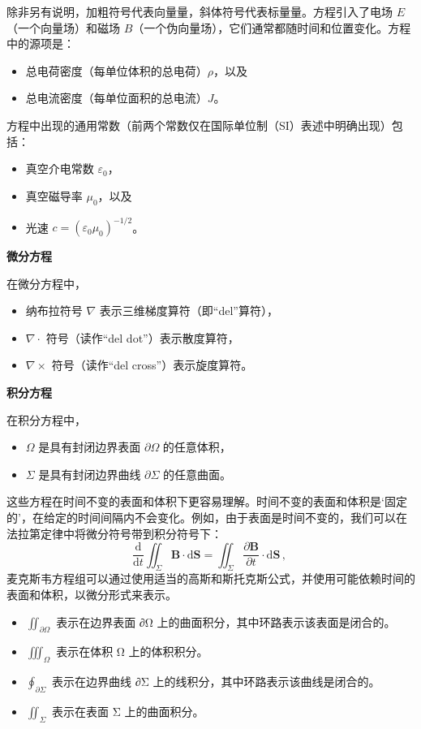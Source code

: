 除非另有说明，加粗符号代表向量量，斜体符号代表标量量。方程引入了电场 \( E \)（一个向量场）和磁场 \( B \)（一个伪向量场），它们通常都随时间和位置变化。方程中的源项是：
\begin{itemize}
\item 总电荷密度（每单位体积的总电荷）\( \rho \)，以及
\item 总电流密度（每单位面积的总电流）\( J \)。
\end{itemize}
方程中出现的通用常数（前两个常数仅在国际单位制（SI）表述中明确出现）包括：
\begin{itemize}
\item 真空介电常数 \( \varepsilon_0 \)，
\item 真空磁导率 \( \mu_0 \)，以及
\item 光速 \( c = (\varepsilon_0 \mu_0)^{-1/2} \)。
\end{itemize}
\textbf{微分方程}

在微分方程中，
\begin{itemize}
\item 纳布拉符号 \( \nabla \) 表示三维梯度算符（即“del”算符），
\item \( \nabla \cdot \) 符号（读作“del dot”）表示散度算符，
\item \( \nabla \times \) 符号（读作“del cross”）表示旋度算符。
\end{itemize}

\textbf{积分方程}

在积分方程中，
\begin{itemize}
\item \( \Omega \) 是具有封闭边界表面 \( \partial \Omega \) 的任意体积，
\item \( \Sigma \) 是具有封闭边界曲线 \( \partial \Sigma \) 的任意曲面。
\end{itemize}
这些方程在时间不变的表面和体积下更容易理解。时间不变的表面和体积是‘固定的’，在给定的时间间隔内不会变化。例如，由于表面是时间不变的，我们可以在法拉第定律中将微分符号带到积分符号下：
\[
\frac{\mathrm{d}}{\mathrm{d} t} \iint_{\Sigma} \mathbf{B} \cdot \mathrm{d} \mathbf{S} = \iint_{\Sigma} \frac{\partial \mathbf{B}}{\partial t} \cdot \mathrm{d} \mathbf{S} \,,~
\]
麦克斯韦方程组可以通过使用适当的高斯和斯托克斯公式，并使用可能依赖时间的表面和体积，以微分形式来表示。
\begin{itemize}
\item  \(\iint_{\partial \Omega}\) 表示在边界表面 ∂Ω 上的曲面积分，其中环路表示该表面是闭合的。
\item  \(\iiint_{\Omega}\) 表示在体积 Ω 上的体积积分。
\item  \(\oint_{\partial \Sigma}\) 表示在边界曲线 ∂Σ 上的线积分，其中环路表示该曲线是闭合的。
\item  \(\iint_{\Sigma}\) 表示在表面 Σ 上的曲面积分。
\end{itemize}

